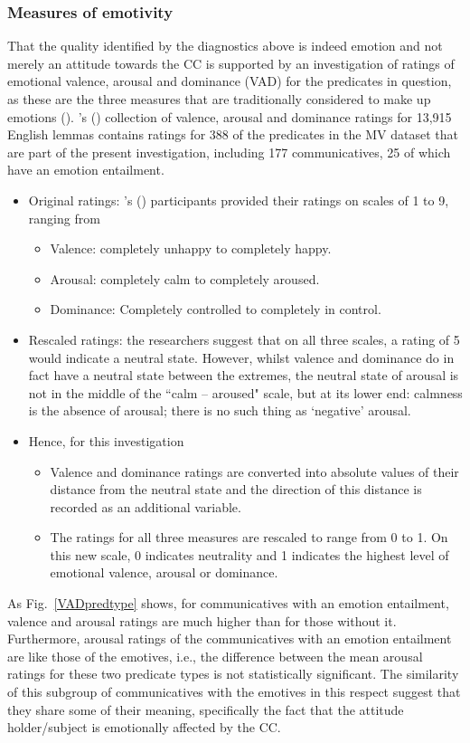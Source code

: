 \documentclass[11pt,fleqn]{article}
\newcommand{\figref}[1]{Fig.~\ref{#1}}
\newcommand{\6}{\mbox{$[\hspace*{-.6mm}[$}}
\newcommand{\9}{\mbox{$]\hspace*{-.6mm}]$}}
\newcommand{\citepos}[1]{\citeauthor{#1}'s (\citeyear{#1})}
\begin{document}
\subsubsection{Measures of emotivity}
That the quality identified by the diagnostics above is indeed emotion and not merely an attitude towards the CC is supported by an investigation of ratings of emotional valence, arousal and dominance (VAD) for the predicates in question, as these are the three measures that are traditionally considered to make up emotions (\citealt{warriner-etal2013}). \citepos{warriner-etal2013} collection of valence, arousal and dominance ratings for 13,915 English lemmas contains ratings for 388 of the predicates in the MV dataset that are part of the present investigation, including 177 communicatives, 25 of which have an emotion entailment.
\begin{itemize}
	\item Original ratings: \citepos{warriner-etal2013} participants provided their ratings on scales of 1 to 9, ranging from 
	\begin{itemize}
		\item Valence: completely unhappy to completely happy.
		\item Arousal: completely calm to completely aroused.
		\item Dominance: Completely controlled to completely in control.
	\end{itemize}
	\item Rescaled ratings: the researchers suggest that on all three scales, a rating of 5 would indicate a neutral state. However, whilst valence and dominance do in fact have a neutral state between the extremes, the neutral state of arousal is not in the middle of the ``calm – aroused" scale, but at its lower end: calmness is the absence of arousal; there is no such thing as ‘negative’ arousal. 
	\item Hence, for this investigation
	\begin{itemize}
		\item Valence and dominance ratings are converted into absolute values of their distance from the neutral state and the direction of this distance is recorded as an additional variable. 
		\item The ratings for all three measures are rescaled to range from 0 to 1. On this new scale, 0 indicates neutrality and 1 indicates the highest level of emotional valence, arousal or dominance.
	\end{itemize}
\end{itemize}
As \figref{VADpredtype} shows, for communicatives with an emotion entailment, valence and arousal ratings are much higher than for those without it. Furthermore, arousal ratings of the communicatives with an emotion entailment are like those of the emotives, i.e., the difference between the mean arousal ratings for these two predicate types is not statistically significant. The similarity of this subgroup of communicatives with the emotives in this respect suggest that they share some of their meaning, specifically the fact that the attitude holder/subject is emotionally affected by the CC.
\end{document}
